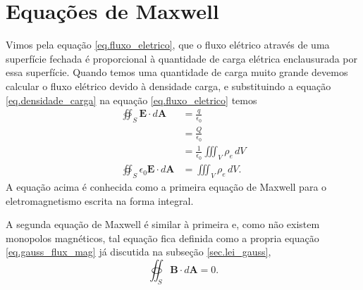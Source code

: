 \section{Equações de Maxwell}
Vimos pela equação \ref{eq.fluxo_eletrico}, que o fluxo elétrico através de uma superfície fechada é proporcional à quantidade de carga elétrica enclausurada por essa superfície. Quando temos uma quantidade de carga muito grande devemos calcular o fluxo elétrico devido à densidade carga, e substituindo a equação \ref{eq.densidade_carga} na equação \ref{eq.fluxo_eletrico} temos
\begin{align*}
\oiint_S\textbf{E}\cdot\textit{d}\textbf{A}&=\frac{q}{\epsilon_0}\\
&=\frac{Q}{\epsilon_0}\\
&=\frac{1}{\epsilon_0}\iiint_{V}\rho_e\,dV\\
\oiint_S\epsilon_0\textbf{E}\cdot\textit{d}\textbf{A}&=\iiint_{V}\rho_e\,dV.
\end{align*}
A equação acima é conhecida como a primeira equação de Maxwell para o eletromagnetismo escrita na forma integral. 


A segunda equação de Maxwell é similar à primeira e, como não existem monopolos magnéticos, tal equação fica definida como a propria equação \ref{eq.gauss_flux_mag} já discutida na subseção \ref{sec.lei_gauss},
\begin{equation*}
\oiint_S\textbf{B}\cdot\textit{d}\textbf{A}=0.
\end{equation*}


